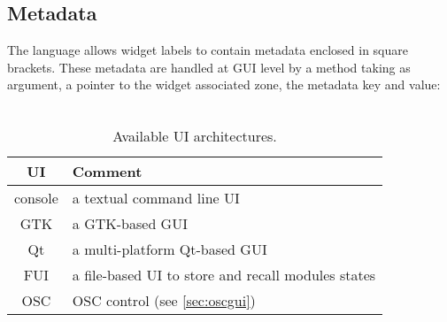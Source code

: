 \subsection{Metadata}
\label{sec:metadata}
The \faust language allows widget labels to contain metadata enclosed in square brackets. These metadata are handled at GUI level by a  method taking as argument, a pointer to the widget associated zone, the metadata key and value: \\
\htab{} \\


\begin{table}[htdp]
\begin{center}
\begin{tabular}{|c|l|}
\hline
\bf{UI} & \bf{Comment} \\
\hline
console  & a textual command line UI \\
GTK  & a GTK-based GUI \\
Qt   & a multi-platform Qt-based GUI \\
FUI  & a file-based UI to store and recall modules states \\
OSC  & OSC control (see \ref{sec:oscgui}) \\
\hline
\end{tabular}
\end{center}
\caption{Available UI architectures.}
\label{tab:uiarch}
\end{table}%

